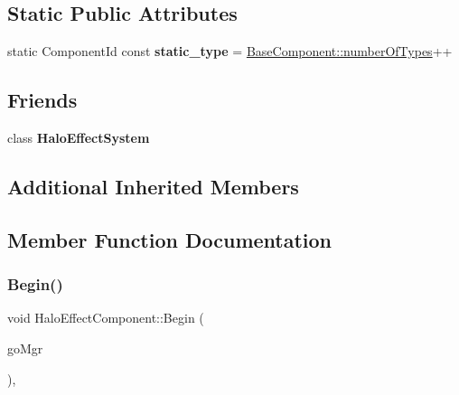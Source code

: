 \subsection*{Static Public Attributes}
\begin{DoxyCompactItemize}
\item 
\mbox{\label{classHaloEffectComponent_a2c5ef701da0b919bcb6eef2415e9cc6b}} 
static Component\+Id const {\bfseries static\+\_\+type} = \hyperlink{classBaseComponent_a084ade347bc71a7f0d3b17ecdc2225a4}{Base\+Component\+::number\+Of\+Types}++
\end{DoxyCompactItemize}
\subsection*{Friends}
\begin{DoxyCompactItemize}
\item 
\mbox{\label{classHaloEffectComponent_a48ea1f3f3b0f91b58f6ccda709a96f69}} 
class {\bfseries Halo\+Effect\+System}
\end{DoxyCompactItemize}
\subsection*{Additional Inherited Members}


\subsection{Member Function Documentation}
\mbox{\label{classHaloEffectComponent_a1845e41e3c47faf344ee4842c3b25737}} 
\subsubsection{\texorpdfstring{Begin()}{Begin()}}
{\footnotesize\ttfamily void Halo\+Effect\+Component\+::\+Begin (\begin{DoxyParamCaption}\item[{\hyperlink{classGameObjectManager}{Game\+Object\+Manager} $\ast$}]{go\+Mgr }\end{DoxyParamCaption})\hspace{0.3cm}{\ttfamily [override]}, {\ttfamily [virtual]}}



